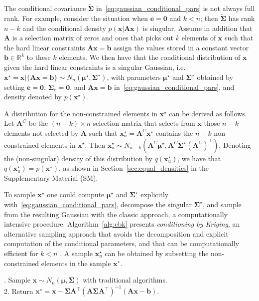 \documentclass[12pt]{article}
\begin{document}
The conditional covariance $\tilde{\bm{\Sigma}}$ in~\eqref{eq:gaussian_conditional_pars} is not always full rank. For example, consider the situation when $\bm{e}=\bm{0}$ and $k<n$; then $\tilde{\bm{\Sigma}}$ has rank $n-k$ and the conditional density $p(\bm{x}|\bm{A}\bm{x})$ is singular. 
Assume in addition that $\bm{A}$ is a selection matrix of zeros and ones that picks out $k$ elements of $\bm{x}$ such that the hard linear constraints $\bm{A} \bm{x} = \bm{b}$ assign the values stored in a constant vector $\bm{b}\in \mathbb{R}^k$ to these $k$ elements. We then have that the conditional distribution of $\bm{x}$ given the hard linear constraints is a singular Gaussian, i.e. $\bm{x}^{\star}=\bm{x}|\{\bm{A}\bm{x}=\bm{b}\}\sim N_n(\bm{\mu}^{\star}, \bm{\Sigma}^{\star})$, with parameters $\bm{\mu}^{\star}$ and $\bm{\Sigma}^{\star}$ obtained by setting $\bm{e}=\bm{0}$, $\bm{\Sigma}_e = \bm{0}$, and $\bm{Ax}=\bm{b}$ in~\eqref{eq:gaussian_conditional_pars}, and density denoted by $p(\bm{x}^{\star})$.

A distribution for the non-constrained elements in $\bm{x}^{\star}$ can be derived as follows. Let $\bm{A}^C$ be the $(n-k) \times n$ selection matrix that selects from $\bm{x}$ those $n-k$ elements not selected by $\bm{A}$ such that $\bm{x}_u^{\star} = \bm{A}^C \bm{x}^{\star} $ contains the $n-k$ non-constrained elements in $\bm{x}^{\star}$. Then $\bm{x}_u^{\star}\sim N_{n-k}(\bm{A}^C\bm{\mu}^{\star}, \bm{A}^C \bm{\Sigma}^{\star} (\bm{A}^{C})^{\top})$. Denoting the (non-singular) density of this distribution by $q(\bm{x}_u^{\star})$, we have that $q(\bm{x}_u^{\star}) = p(\bm{x}^{\star})$, as shown in Section~\ref{sec:equal_densities} in the Supplementary Material (SM). 

To sample $\bm{x}^{\star}$ one could compute $\bm{\mu}^{\star}$ and $\bm{\Sigma}^{\star}$ explicitly with~\eqref{eq:gaussian_conditional_pars}, decompose the singular $\bm{\Sigma}^{\star}$, and sample from the resulting Gaussian with the classic approach, a computationally intensive procedure. Algorithm~\ref{alg:cbk} presents \textit{conditioning by Kriging}, an alternative  sampling approach that avoids the decomposition and explicit computation of the conditional parameters, and that can be computationally efficient for $k<n$ \citep{RueHeld2005}. 
A sample $\bm{x}^{\star}_u$ can be obtained by subsetting the non-constrained elements in the sample $\bm{x}^{\star}$.

\begin{algorithm}[t]
\caption{Sample $\bm{x}^{\star} \sim N_{n}(\bm{\mu}^{\star}, \bm{\Sigma}^{\star})$ with conditioning by Kriging.}
\label{alg:cbk}
. Sample $\bm{x} \sim N_n(\bm{\mu}, \bm{\Sigma})$ with traditional algorithms. \\
2. Return $\bm{x}^{\star} = \bm{x} - \bm{\Sigma} \bm{A}^{\top} (\bm{A} \bm{\Sigma} \bm{A}^{\top})^{-1} (\bm{A}\bm{x} - \bm{b})$.
\end{algorithm}
\end{document}
